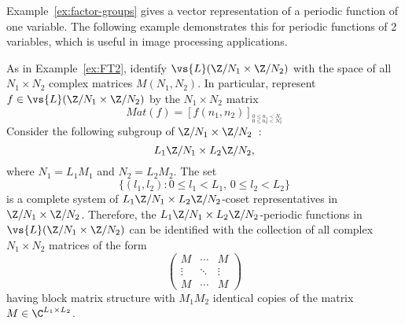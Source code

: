 Example~\ref{ex:factor-groups} gives a vector representation of a periodic
function of one variable.  The following example demonstrates this for
periodic functions of 2 variables, which is useful in image processing applications.
\begin{example}
As in Example~\ref{ex:FT2}, identify $\vs{L}(\Z/N_1 \times \Z/N_2)$ with the
space of all $N_1 \times N_2$ complex matrices $M(N_1,N_2)$.  In particular,
represent $f\in \vs{L}(\Z/N_1 \times \Z/N_2)$ by the $N_1\times N_2$ matrix
\[
Mat(f) = \left[f(n_1,n_2) \right]_{\stackrel{0\leq n_1 < N_1}{_{0\leq n_2 < N_2}}}
\]
Consider the following subgroup of $\Z/N_1 \times \Z/N_2$~:
\[
L_1\Z/N_1 \times L_2\Z/N_2, %
\]
where $N_1 = L_1M_1$ and $N_2 = L_2M_2$.  The set 
\[
\{(l_1,l_2):0\leq l_1 <L_1,\,0\leq l_2 <L_2\}
\]
is a complete system of 
$L_1\Z/N_1 \times L_2\Z/N_2$-coset representatives in $\Z/N_1 \times \Z/N_2$.
Therefore, the $L_1\Z/N_1 \times L_2\Z/N_2$-periodic functions in 
$\vs{L}(\Z/N_1 \times \Z/N_2)$ can be identified with the collection of all complex
$N_1 \times N_2$ matrices of the form
\[
\begin{pmatrix}%
M &\cdots &M\\
\vdots &\ddots & \vdots\\
M &\cdots &M
\end{pmatrix}%
\]
having block matrix structure with $M_1M_2$ identical copies of the matrix 
$M\in\C^{L_1\times L_2}$. 
\end{example}

